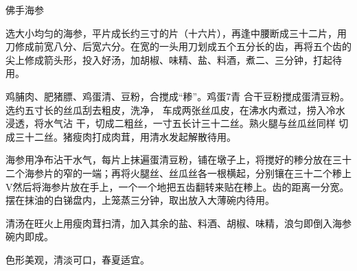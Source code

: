 \begin{recipe}{佛手海参}

\ingredients



\cooking

\step 选大小均匀的海参，平片成长约三寸的片（十六片），再逢中腰断成三十二片，用刀修成前宽八分、后宽六分。在宽的一头用刀划成五个五分长的齿，再将五个齿的尖上修成箭头形，投入好汤，加胡椒、味精、盐、料酒，煮二、三分钟，打起待用。

鸡脯肉、肥猪膘、鸡蛋清、豆粉，合搅成“糁”。鸡蛋7青 合干豆粉搅成蛋清豆粉。选约五寸长的丝瓜刮去粗皮，洗净， 车成两张丝瓜皮，在沸水内煮过，捞入冷水浸透，将水气沾 干，切成二粗丝，一寸五长计三十二丝。熟火腿与丝瓜丝同样 切成三十二丝。猪瘦肉打成肉茸，用清水发起解散待用。

\step 海参用净布沾干水气，每片上抹遍蛋清豆粉，铺在墩子上，将搅好的糁分放在三十二个海参片的窄的一端；再将火腿丝、丝瓜丝各一根横起，分别镶在三十二个糁上V然后将海参片放在手上，一个一个地把五齿翻转来贴在糁上。齿的距离一分宽。摆在抹油的白锑盘内，上笼蒸三分钟，取出放入大薄碗内待用。

\step 清汤在旺火上用瘦肉茸扫清，加入其余的盐、料酒、胡椒、味精，浪匀即倒入海参碗内即成。

\notes

色形美观，清淡可口，春夏适宜。

\end{recipe}

